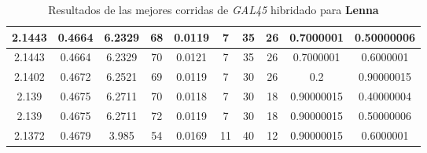 \begin{table}[h!]
\begin{center}
\begin{tabular}{|c|c|c|c|c|c|c|c|c|c|}
        \hline
        \hline
            2.1443 & 0.4664  & 6.2329 & 68 & 0.0119 & 7 & 35 & 26 & 0.7000001 & 0.50000006\\
        \hline
        \hline
            2.1443 & 0.4664  & 6.2329 & 70 & 0.0121 & 7 & 35 & 26 & 0.7000001 & 0.6000001\\
        \hline
        \hline
            2.1402 & 0.4672  & 6.2521 & 69 & 0.0119 & 7 & 30 & 26 & 0.2 & 0.90000015\\
        \hline
        \hline
            2.139 & 0.4675  & 6.2711 & 70 & 0.0118 & 7 & 30 & 18 & 0.90000015 & 0.40000004\\
        \hline
        \hline
            2.139 & 0.4675  & 6.2711 & 72 & 0.0119 & 7 & 30 & 18 & 0.90000015 & 0.50000006\\
        \hline
        \hline
            2.1372 & 0.4679  & 3.985 & 54 & 0.0169 & 11 & 40 & 12 & 0.90000015 & 0.6000001\\
        \hline
        \end{tabular}
        \caption{Resultados de las mejores corridas de \emph{GAL45} hibridado para {\bf Lenna}}
        \label{tb:tableGAL45}
    \end{center}
\end{table}

